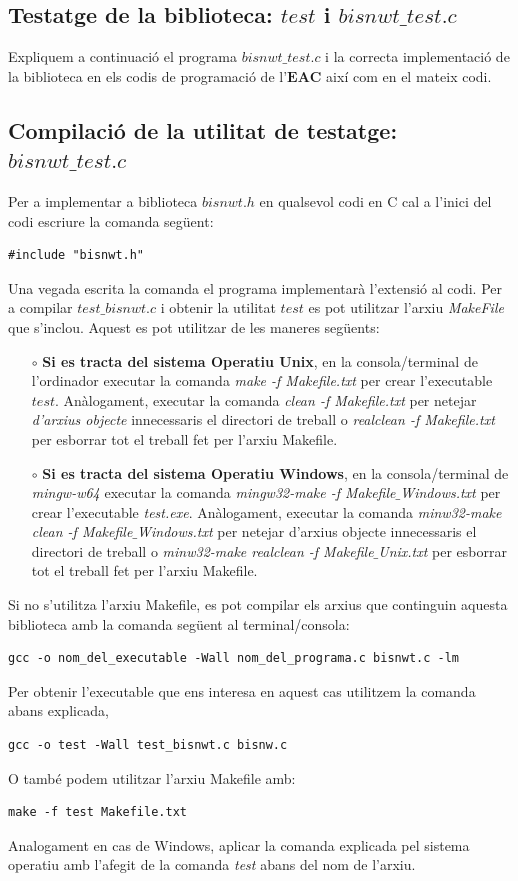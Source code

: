 \documentclass[12pt]{article}
\begin{document}
\subsection{Testatge de la biblioteca: $test$ i $bisnwt\_test.c$}
Expliquem a continuació el programa $bisnwt\_test.c$ i la correcta implementació de la biblioteca en els codis de programació de l'$\mathbf{EAC}$ així com en el mateix codi.
\subsection{Compilació de la utilitat de testatge: $bisnwt\_test.c$}
Per a implementar a biblioteca $bisnwt.h$ en qualsevol codi en C cal a l'inici del codi escriure la comanda següent:
\begin{verbatim}
#include "bisnwt.h"
\end{verbatim}
Una vegada escrita la comanda el programa implementarà l'extensió al codi.
\newline
Per a compilar $test\_bisnwt.c$ i obtenir la utilitat $test$ es pot utilitzar l'arxiu \textit{MakeFile} que s'inclou. \newline
Aquest es pot utilitzar de les maneres següents:
\begin{itemize}
\item [$\circ$] \textbf{Si es tracta del sistema Operatiu Unix}, en la consola/terminal de l'ordinador executar la comanda \textit{make -f Makefile.txt} per crear l'executable $test$.
\newline
Anàlogament, executar la comanda \textit{clean -f Makefile.txt} per netejar \textit{d'arxius objecte} innecessaris el directori de treball o \textit{realclean -f Makefile.txt} per esborrar tot el treball fet per l'arxiu Makefile.
\item [$\circ$] \textbf{Si es tracta del sistema Operatiu Windows}, en la consola/terminal de \textit{mingw-w64} executar la comanda \textit{mingw32-make -f Makefile$\_$Windows.txt} per crear l'executable \textit{test.exe}.
\newline
Anàlogament, executar la comanda \textit{minw32-make clean -f Makefile$\_$Windows.txt} per netejar d'arxius objecte innecessaris el directori de treball o \textit{minw32-make realclean -f Makefile$\_$Unix.txt} per esborrar tot el treball fet per l'arxiu Makefile.
\end{itemize}
Si no s'utilitza l'arxiu Makefile, es pot compilar els arxius que continguin aquesta biblioteca amb la comanda següent al terminal/consola:
\begin{verbatim}
gcc -o nom_del_executable -Wall nom_del_programa.c bisnwt.c -lm
\end{verbatim}
\newpage
Per obtenir l'executable que ens interesa en aquest cas utilitzem la comanda abans explicada,
\begin{verbatim}
gcc -o test -Wall test_bisnwt.c bisnw.c
\end{verbatim}
O també podem utilitzar l'arxiu Makefile amb:
\begin{verbatim}
make -f test Makefile.txt
\end{verbatim}
Analogament en cas de Windows, aplicar la comanda explicada pel sistema operatiu amb l'afegit de la comanda \textit{test} abans del nom de l'arxiu.
\end{document}
